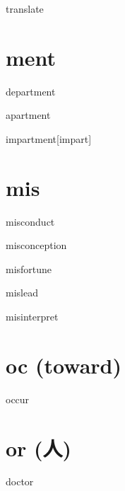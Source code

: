 \begin{RefWord}{translate}
\end{RefWord}

\section{ment}

\begin{RefWord}{department}
\end{RefWord}

\begin{RefWord}{apartment}
\end{RefWord}

\begin{RefWord}{impartment}[impart]
\end{RefWord}

\section{mis}

\begin{RefWord}{misconduct}
\end{RefWord}

\begin{RefWord}{misconception}
\end{RefWord}

\begin{RefWord}{misfortune}
\end{RefWord}

\begin{RefWord}{mislead}
\end{RefWord}

\begin{RefWord}{misinterpret}
\end{RefWord}

\section{oc (toward)}

\begin{RefWord}{occur}
\end{RefWord}

\section{or (人)}


\begin{RefWord}{doctor}
\end{RefWord}

